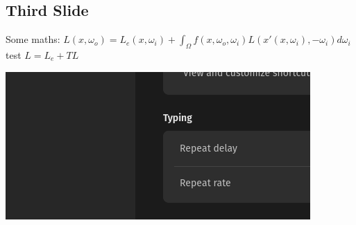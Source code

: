 \documentclass[ 6pt, a4paper, landscape ]{scrartcl}
\begin{document}
\begin{multicols}{4}
\begin{breakbox}
	\end{breakbox}
	
	\begin{breakbox}
		\section{Third Slide}
Some maths:
\begin{math}
L(x, \omega_o) = L_e(x, \omega_i) + \int_\Omega f(x, \omega_o, \omega_i) L(x'(x, \omega_i), -\omega_i) d\omega_i
\end{math}
test\newline
$L = L_e + TL$

\includegraphics[width=0.8\columnwidth]{ test.png }



\end{breakbox}
\end{multicols}
\end{document}
